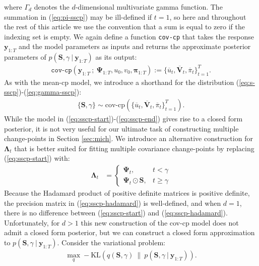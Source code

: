 where $\Gamma_d$ denotes the $d$-dimensional multivariate gamma function. The summation in (\ref{eq:pi-sscp}) may be ill-defined if $t = 1$, so here and throughout the rest of this article we use the convention that a sum is equal to zero if the indexing set is empty. We again define a function \texttt{cov-cp} that takes the response $\mathbf{y}_{1:T}$ and the model parameters as inputs and returns the approximate posterior parameters of $p(\mathbf{S}, \gamma\:|\:\mathbf{y}_{1:T})$ as its output: 
\begin{align}
    \texttt{cov-cp}\left(\mathbf{y}_{1:T} \:;\: \boldsymbol{\Psi}_{1:T}, u_0, v_0, \boldsymbol{\pi}_{1:T}\right) := \{\overline{u}_t, \overline{\mathbf{V}}_t, \overline{\pi}_t\}_{t=1}^T.
\end{align}
As with the mean-cp model, we introduce a shorthand for the distribution (\ref{eq:s-sscp})-(\ref{eq:gamma-sscp}): 
\begin{align}
    \{\mathbf{S},\gamma\} \sim \text{cov-cp}(\{\overline{u}_t, \overline{\mathbf{V}}_t, \overline{\pi}_t\}_{t=1}^T).
\end{align}
While the model in (\ref{eq:sscp-start})-(\ref{eq:sscp-end}) gives rise to a closed form posterior, it is not very useful for our ultimate task of constructing multiple change-points in Section \ref{sec:mich}. We introduce an alternative construction for $\boldsymbol{\Lambda}_t$ that is better suited for fitting multiple covariance change-points by replacing (\ref{eq:sscp-start}) with: 
\begin{align}\label{eq:sscp-hadamard}
    \boldsymbol{\Lambda}_t &= 
    \begin{cases}
        \boldsymbol{\Psi}_{t}, & t < \gamma  \\
        \boldsymbol{\Psi}_{t} \odot \mathbf{S}, & t \geq \gamma
    \end{cases}
\end{align}
Because the Hadamard product of positive definite matrices is positive definite, the precision matrix in (\ref{eq:sscp-hadamard}) is well-defined, and when $d=1$, there is no difference between (\ref{eq:sscp-start}) and (\ref{eq:sscp-hadamard}). Unfortunately, for $d >1$ this new construction of the cov-cp model does not admit a closed form posterior, but we can construct a closed form approximation to $p(\mathbf{S}, \gamma\:|\:\mathbf{y}_{1:T})$. Consider the variational problem:
\begin{align}\label{eq:sscp-kl}
    \max_{q} -\text{KL}( q(\mathbf{S}, \gamma) \:\lVert\: p(\mathbf{S}, \gamma\:|\:\mathbf{y}_{1:T})).
\end{align}
